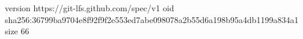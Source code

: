 version https://git-lfs.github.com/spec/v1
oid sha256:36799ba9704e8f92f9f2e553ed7abe098078a2b55d6a198b95a4db1199a834a1
size 66
